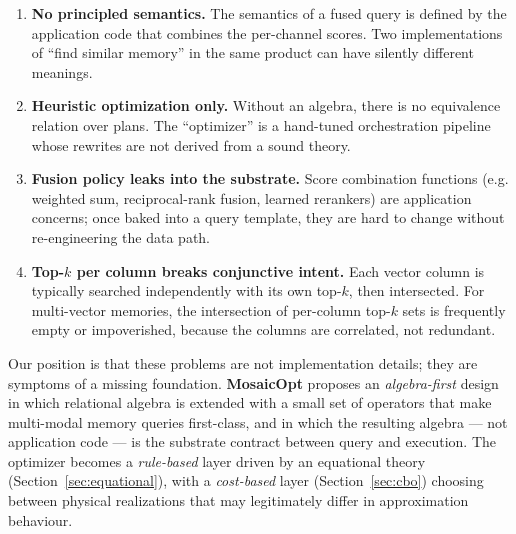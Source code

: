 \documentclass[sigconf,nonacm,review]{acmart}
\theoremstyle{plain}
\theoremstyle{definition}
\theoremstyle{remark}
\begin{document}
\begin{enumerate}[leftmargin=*]
  \item \textbf{No principled semantics.} The semantics of a fused
    query is defined by the application code that combines the
    per-channel scores. Two implementations of ``find similar memory''
    in the same product can have silently different meanings.
  \item \textbf{Heuristic optimization only.} Without an algebra, there
    is no equivalence relation over plans. The ``optimizer'' is a
    hand-tuned orchestration pipeline whose rewrites are not derived
    from a sound theory.
  \item \textbf{Fusion policy leaks into the substrate.} Score
    combination functions (e.g. weighted sum, reciprocal-rank fusion,
    learned rerankers) are application concerns; once baked into a
    query template, they are hard to change without re-engineering the
    data path.
  \item \textbf{Top-$k$ per column breaks conjunctive intent.} Each
    vector column is typically searched independently with its own
    top-$k$, then intersected. For multi-vector memories, the
    intersection of per-column top-$k$ sets is frequently empty or
    impoverished, because the columns are correlated, not redundant.
\end{enumerate}

Our position is that these problems are not implementation details;
they are symptoms of a missing foundation. \textbf{MosaicOpt} proposes
an \emph{algebra-first} design in which relational algebra is extended
with a small set of operators that make multi-modal memory queries
first-class, and in which the resulting algebra --- not application
code --- is the substrate contract between query and execution. The
optimizer becomes a \emph{rule-based} layer driven by an equational
theory (Section~\ref{sec:equational}), with a
\emph{cost-based} layer (Section~\ref{sec:cbo}) choosing between
physical realizations that may legitimately differ in approximation
behaviour.
\end{document}
